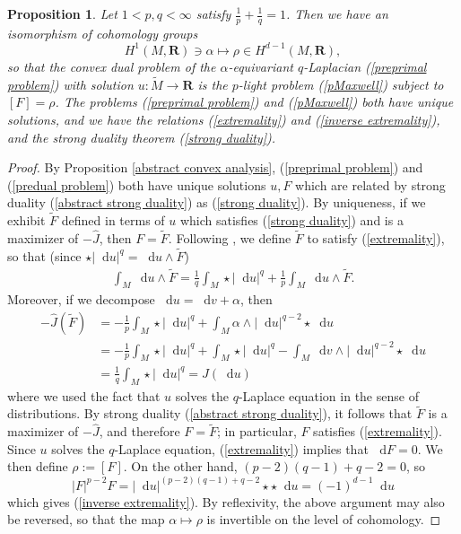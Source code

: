 \documentclass[reqno,11pt]{amsart}
\newcommand{\RR}{\mathbf{R}}
\newcommand*\dif{\mathop{}\!\mathrm{d}}
\newtheorem{proposition}[theorem]{Proposition}
\theoremstyle{definition}
\numberwithin{equation}{section}
\begin{document}
\begin{proposition}\label{convex duality}
Let $1 < p, q < \infty$ satisfy $\frac{1}{p} + \frac{1}{q} = 1$.
Then we have an isomorphism of cohomology groups
$$H^1(M, \RR) \ni \alpha \mapsto \rho \in H^{d - 1}(M, \RR),$$
so that the convex dual problem of the $\alpha$-equivariant $q$-Laplacian (\ref{preprimal problem}) with solution $u: \tilde M \to \RR$ is the $p$-light problem (\ref{pMaxwell}) subject to $[F] = \rho$.
The problems (\ref{preprimal problem}) and (\ref{pMaxwell}) both have unique solutions, and we have the relations (\ref{extremality}) and (\ref{inverse extremality}), and the strong duality theorem (\ref{strong duality}).
\end{proposition}
\begin{proof}
By Proposition \ref{abstract convex analysis}, (\ref{preprimal problem}) and (\ref{predual problem}) both have unique solutions $u, F$ which are related by strong duality (\ref{abstract strong duality}) as (\ref{strong duality}).
By uniqueness, if we exhibit $\tilde F$ defined in terms of $u$ which satisfies (\ref{strong duality}) and is a maximizer of $-\hat J$, then $F = \tilde F$.
Following \cite[Chapter IV, (2.12)]{Ekeland99}, we define $\tilde F$ to satisfy (\ref{extremality}), so that (since $\star |\dif u|^q = \dif u \wedge \tilde F$)
\begin{align*}
\int_M \dif u \wedge \tilde F 
= \frac{1}{q} \int_M \star |\dif u|^q + \frac{1}{p} \int_M \dif u \wedge \tilde F.
\end{align*}
Moreover, if we decompose $\dif u = \dif v + \alpha$, then
\begin{align*}
-\hat J(\tilde F)
&= -\frac{1}{p} \int_M \star |\dif u|^q + \int_M \alpha \wedge |\dif u|^{q - 2} \star \dif u \\
&= -\frac{1}{p} \int_M \star |\dif u|^q + \int_M \star |\dif u|^q - \int_M \dif v \wedge |\dif u|^{q - 2} \star \dif u \\
&= \frac{1}{q} \int_M \star |\dif u|^q = J(\dif u)
\end{align*}
where we used the fact that $u$ solves the $q$-Laplace equation in the sense of distributions.
By strong duality (\ref{abstract strong duality}), it follows that $\tilde F$ is a maximizer of $-\hat J$, and therefore $F = \tilde F$; in particular, $F$ satisfies (\ref{extremality}).
Since $u$ solves the $q$-Laplace equation, (\ref{extremality}) implies that $\dif F = 0$.
We then define $\rho := [F]$.
On the other hand, $(p - 2)(q - 1) + q - 2 = 0$, so
$$|F|^{p - 2} F = |\dif u|^{(p - 2)(q - 1) + q - 2} \star \star \dif u = (-1)^{d - 1} \dif u$$
which gives (\ref{inverse extremality}).
By reflexivity, the above argument may also be reversed, so that the map $\alpha \mapsto \rho$ is invertible on the level of cohomology.
\end{proof}
\end{document}
